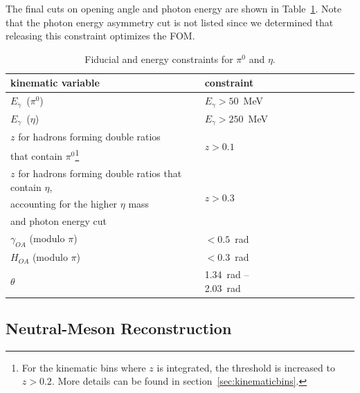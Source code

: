 The final cuts on opening angle and photon energy are shown in Table~\ref{tab:constrain}. Note that the photon energy asymmetry cut is not listed since we determined that releasing this constraint optimizes the FOM.

\begin{table}[H]\small
\centering
\begin{tabular}{|l|l|l|l|l|l|l|l|l|}
\hline
kinematic variable & constraint   \\ \hline
$E_\gamma$~($\pi^0$) & $E_\gamma >50$~MeV \\ \hline
$E_\gamma$~($\eta$) & $E_\gamma >250$~MeV \\ \hline
$z$  for hadrons forming double ratios &\multirow{2}{*}{$z>0.1$}\\
 that contain $\pi^0$\footnote{For the kinematic bins where $z$ is  integrated, the threshold is increased to $z>0.2$. More details can be found in section~\ref{sec:kinematicbins}.}&  \\ \hline
$z$ for hadrons forming double ratios that contain $\eta$,& \multirow{3}{*}{$z>0.3$} \\ accounting for the higher $\eta$ mass &\\and photon energy cut & \\ \hline
$\gamma_{OA}$ (modulo $\pi$) & $<0.5$~rad \\ \hline
$H_{OA}$ (modulo $\pi$) & $<0.3$~rad \\ \hline
$\theta$ &  1.34~rad  --  2.03~rad  \\ \hline
\end{tabular}
\caption{Fiducial and energy constraints for $\pi^0$ and $\eta$.}
\label{tab:constrain}
\end{table}

\subsection{Neutral-Meson Reconstruction}
\label{sec:neutralmesonreconstruction}

